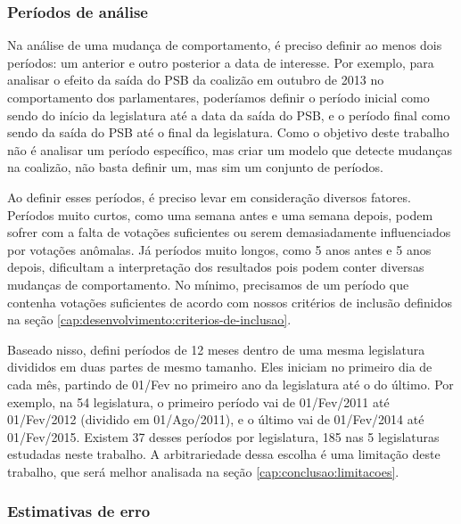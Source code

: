 \documentclass[a4paper,titlepage]{ppgi}\usepackage[]{graphicx}\usepackage[]{color}
\begin{document}
\subsubsection{Períodos de análise}
\label{cap:desenvolvimento:periodos-de-analise}

Na análise de uma mudança de comportamento, é preciso definir ao menos dois
períodos: um anterior e outro posterior a data de interesse. Por exemplo, para
analisar o efeito da saída do PSB da coalizão em outubro de 2013 no
comportamento dos parlamentares, poderíamos definir o período inicial como
sendo do início da legislatura até a data da saída do PSB, e o período final
como sendo da saída do PSB até o final da legislatura. Como o objetivo deste
trabalho não é analisar um período específico, mas criar um modelo que detecte
mudanças na coalizão, não basta definir um, mas sim um conjunto de
períodos.

Ao definir esses períodos, é preciso levar em consideração diversos fatores.
Períodos muito curtos, como uma semana antes e uma semana depois, podem sofrer
com a falta de votações suficientes ou serem demasiadamente influenciados por
votações anômalas. Já períodos muito longos, como 5 anos antes e 5 anos depois,
dificultam a interpretação dos resultados pois podem conter diversas mudanças
de comportamento. No mínimo, precisamos de um período que contenha votações
suficientes de acordo com nossos critérios de inclusão definidos na seção
\ref{cap:desenvolvimento:criterios-de-inclusao}.

Baseado nisso, defini períodos de 12 meses dentro de uma mesma legislatura
divididos em duas partes de mesmo tamanho. Eles iniciam no primeiro dia de cada
mês, partindo de 01/Fev no primeiro ano da legislatura até o do último. Por
exemplo, na 54\textordfeminine{} legislatura, o primeiro período vai de
01/Fev/2011 até 01/Fev/2012 (dividido em 01/Ago/2011), e o último vai de
01/Fev/2014 até 01/Fev/2015. Existem 37 desses períodos por legislatura, 185
nas 5 legislaturas estudadas neste trabalho. A arbitrariedade dessa escolha é
uma limitação deste trabalho, que será melhor analisada na seção
\ref{cap:conclusao:limitacoes}.

\subsubsection{Estimativas de erro}
\label{cap:miolo:estimativas-de-erro}
\end{document}
